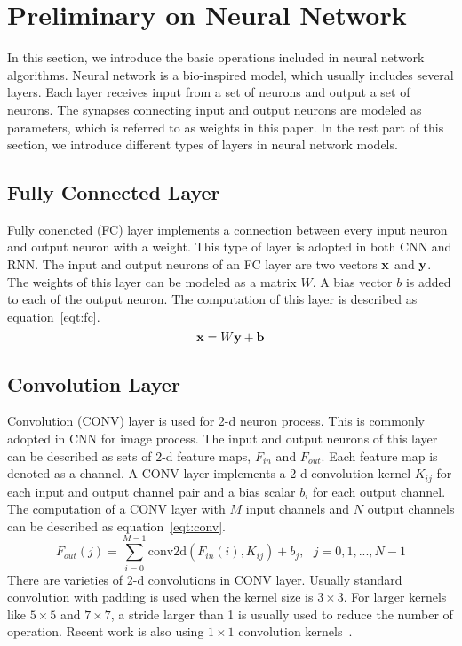 \section{Preliminary on Neural Network}\label{sec:preliminary}

In this section, we introduce the basic operations included in neural network algorithms. Neural network is a bio-inspired model, which usually includes several layers. Each layer receives input from a set of neurons and output a set of neurons. The synapses connecting input and output neurons are modeled as parameters, which is referred to as weights in this paper. In the rest part of this section, we introduce different types of layers in neural network models.

\subsection{Fully Connected Layer}

Fully conencted (FC) layer implements a connection between every input neuron and output neuron with a weight. This type of layer is adopted in both CNN and RNN. The input and output neurons of an FC layer are two vectors $\bf{x}$ and $\bf{y}$. The weights of this layer can be modeled as a matrix $W$. A bias vector $b$ is added to each of the output neuron. The computation of this layer is described as equation~\ref{eqt:fc}.
\begin{equation}\label{eqt:fc}
    {\bf{x}} = W{\bf{y}} + {\bf{b}}
\end{equation}

\subsection{Convolution Layer}
Convolution (CONV) layer is used for 2-d neuron process. This is commonly adopted in CNN for image process. The input and output neurons of this layer can be described as sets of 2-d feature maps, $F_{in}$ and $F_{out}$. Each feature map is denoted as a channel. A CONV layer implements a 2-d convolution kernel $K_{ij}$ for each input and output channel pair and a bias scalar $b_i$ for each output channel. The computation of a CONV layer with $M$ input channels and $N$ output channels can be described as equation~\ref{eqt:conv}.
\begin{equation}\label{eqt:conv}
    F_{out}(j) = \sum_{i=0}^{M-1} \text{conv2d}(F_{in}(i), K_{ij}) + b_j, \text{      } j=0,1,...,N-1
\end{equation}
There are varieties of 2-d convolutions in CONV layer. Usually standard convolution with padding is used when the kernel size is $3\times 3$. For larger kernels like $5\times 5$ and $7\times 7$, a stride larger than 1 is usually used to reduce the number of operation. Recent work is also using $1\times 1$ convolution kernels~\cite{he2016deep, iandola2016squeezenet}.

